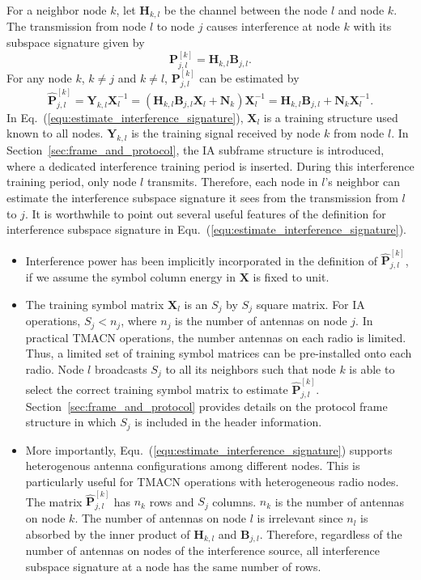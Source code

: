 \documentclass[letterpaper,11pt]{article}
\begin{document}
For a neighbor node $k$, let $\mathbf{H}_{k,l}$ be the channel between the node $l$ and node $k$. The transmission from node $l$ to node $j$ causes interference at node $k$ with its subspace signature given by
\begin{equation}
\mathbf{P}^{[k]}_{j,l}=\mathbf{H}_{k,l}\mathbf{B}_{j,l}.
\end{equation}
For any node $k$, $k\neq j$ and $k\neq l$, $\mathbf{P}^{[k]}_{j,l}$ can be estimated by
\begin{equation}\label{equ:estimate_interference_signature}
\hat{\mathbf{P}}^{[k]}_{j,l} = \mathbf{Y}_{k,l}\mathbf{X}_l^{-1}=\left(\mathbf{H}_{k,l}\mathbf{B}_{j,l}\mathbf{X}_l+\mathbf{N}_k\right)\mathbf{X}_l^{-1}=\mathbf{H}_{k,l}\mathbf{B}_{j,l}+\mathbf{N}_k\mathbf{X}^{-1}_l.
\end{equation}
In Eq.~(\ref{equ:estimate_interference_signature}),  $\mathbf{X}_l$ is a training structure used known to all nodes. $\mathbf{Y}_{k,l}$ is the training signal received by node $k$ from node $l$. In Section~\ref{sec:frame_and_protocol}, the IA subframe structure is introduced, where a dedicated interference training period is inserted. During this interference training period, only node $l$ transmits. Therefore, each node in $l$'s neighbor can estimate the interference subspace signature it sees from the transmission from $l$ to $j$. It is worthwhile to point out several useful features of the definition for interference subspace signature in Equ.~(\ref{equ:estimate_interference_signature}).
\begin{itemize}[noitemsep,nolistsep]
\item Interference power has been implicitly incorporated in the definition of $\hat{\mathbf{P}}^{[k]}_{j,l}$, if we assume the symbol column energy in $\mathbf{X}$ is fixed to unit. 
\item The training symbol matrix $\mathbf{X}_l$ is an $S_j$ by $S_j$ square matrix. For IA operations, $S_j<n_j$, where $n_j$ is the number of antennas on node $j$. In practical TMACN operations, the number antennas on each radio is limited. Thus, a limited set of training symbol matrices can be pre-installed onto each radio. Node $l$ broadcasts $S_j$ to all its neighbors such that node $k$ is able to select the correct training symbol matrix to estimate $\hat{\mathbf{P}}^{[k]}_{j,l}$. Section~\ref{sec:frame_and_protocol} provides details on the protocol frame structure in which $S_j$ is included in the header information.
\item More importantly, Equ.~(\ref{equ:estimate_interference_signature}) supports heterogenous antenna configurations among different nodes. This is particularly useful for TMACN operations with heterogeneous radio nodes. The matrix  $\hat{\mathbf{P}}^{[k]}_{j,l}$ has $n_k$ rows and $S_j$ columns. $n_k$ is the number of antennas on node $k$. The number of antennas on node $l$ is irrelevant since $n_l$ is absorbed by the inner product of $\mathbf{H}_{k,l}$ and $\mathbf{B}_{j,l}$. Therefore, regardless of the number of antennas on nodes of the interference source, all interference subspace signature at a node has the same number of rows. 
\end{itemize}
\end{document}
